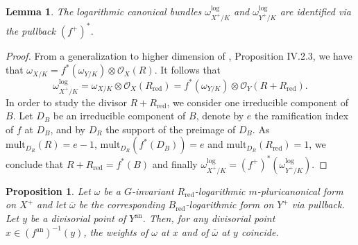 \documentclass{amsart}%
\numberwithin{equation}{subsection}
\theoremstyle{plain2}
\newtheorem{lemma}[equation]{Lemma}
\newtheorem{prop}[equation]{Proposition}
\theoremstyle{definition2}
\theoremstyle{stepstyle}
\theoremstyle{point}
\theoremstyle{subpoint}
\newcommand{\redu}{\mathrm{red}}
\newcommand{\an}{\mathrm{an}}
\begin{document}
\begin{lemma} \label{lemma quotient map is log etale}
The logarithmic canonical bundles $\omega_{X^+/K}^{\log}$ and $\omega_{Y^+/K}^{\log}$ are identified via the pullback $(f^+)^*$. 
\end{lemma}
\begin{proof}
From a generalization to higher dimension of \cite{Hartshorne1977}, Proposition IV.2.3, we have that $\omega_{X/K}=f^*(\omega_{Y/K}) \otimes\mathcal{O}_{X}(R)$. It follows that 
$$\omega_{X^+/K}^{\log} = \omega_{X/K} \otimes\mathcal{O}_{X}(R_\redu) = f^*(\omega_{Y/K}) \otimes \mathcal{O}_{Y}(R + R_\redu).$$
In order to study the divisor $R + R_\redu$, we consider one irreducible component of $B$. Let $D_B$ be an irreducible component of $B$, denote by $e$ the ramification index of $f$ at $D_B$, and by $D_R$ the support of the preimage of $D_B$. As $\text{mult}_{D_R}(R)=e-1$, $\text{mult}_{D_R}(f^*(D_B))= e$ and $\text{mult}_{D_R}(R_\redu)=1$, we conclude that $R + R_\redu= f^*(B)$ and finally $\omega_{X^+/K}^{\log} = (f^+)^*(\omega_{Y^+/K}^{\log})$.
\end{proof}
\begin{prop} \label{prop:G inv form and corresponding weights}
Let $\omega$ be a $G$-invariant $R_\redu$-logarithmic $m$-pluricanonical form on $X^+$ and let $\overline{\omega}$ be the corresponding $B_\redu$-logarithmic form on $Y^+$ via pullback. Let $y$ be a divisorial point of $Y^\an$. Then, for any divisorial point $x \in (f^\an)^{-1}(y)$, the weights of $\omega$ at $x$ and of $\overline{\omega}$ at $y$ coincide.
\end{prop}
\end{document}
